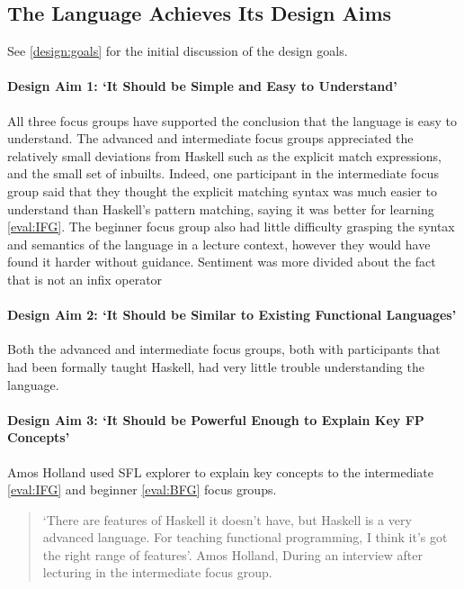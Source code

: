 \subsection{The Language Achieves Its Design Aims}
See \ref{design:goals} for the initial discussion of the design goals. 

\paragraph{Design Aim 1: `It Should be Simple and Easy to Understand'}
All three focus groups have supported the conclusion that the language is easy to understand. The advanced and intermediate focus groups appreciated the relatively small deviations from Haskell such as the explicit match expressions, and the small set of inbuilts. Indeed, one participant in the intermediate focus group said that they thought the explicit matching syntax was much easier to understand than Haskell's pattern matching, saying it was better for learning \ref{eval:IFG}. The beginner focus group also had little difficulty grasping the syntax and semantics of the language in a lecture context, however they would have found it harder without guidance. Sentiment was more divided about the fact that  is not an infix operator


\paragraph{Design Aim 2: `It Should be Similar to Existing Functional Languages'}
Both the advanced and intermediate focus groups, both with participants that had been formally taught Haskell, had very little trouble understanding the language. 

\paragraph{Design Aim 3: `It Should be Powerful Enough to Explain Key \ac{FP} Concepts'}
Amos Holland used SFL explorer to explain key concepts to the intermediate \ref{eval:IFG} and beginner \ref{eval:BFG} focus groups. 

\begin{quotation}
\noindent `There are features of Haskell it doesn't have, but Haskell is a very advanced language. For teaching functional programming, I think it's got the right range of features'. Amos Holland, During an interview after lecturing in the intermediate focus group.
\end{quotation}

